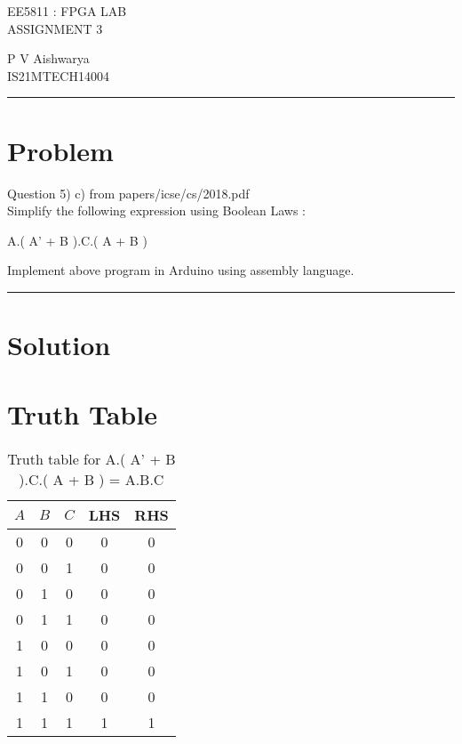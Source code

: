 \documentclass[10pt,a4paper]{article}
\begin{document}
\begin{center}

{\huge EE5811 : FPGA LAB}\\
{\large ASSIGNMENT 3}

\end{center}
P V Aishwarya \\ IS21MTECH14004

\vspace{15pt}
\hrule
\vspace{5pt}


\section*{Problem}

Question 5) c) from papers/icse/cs/2018.pdf\\
Simplify the following expression using Boolean Laws :

\begin{center}
    A.( A' + B ).C.( A + B )
\end{center}

Implement above program in Arduino using assembly language.

\vspace{15pt}
\hrule
\vspace{5pt}

\section*{Solution}

\section*{Truth Table}
\begin{table}[h]
    \centering
    \begin{tabular}{|c|c|c|c|c|}
        \hline
        $A$&$B$&$C$&LHS&RHS \\
        \hline
         0&0&0&0&0 \\
         0&0&1&0&0 \\
         0&1&0&0&0 \\
         0&1&1&0&0 \\
         1&0&0&0&0 \\
         1&0&1&0&0 \\
         1&1&0&0&0 \\
         1&1&1&1&1 \\
         \hline
    \end{tabular}
    \caption{Truth table for A.( A' + B ).C.( A + B ) = A.B.C}
    \label{tab:my_label}
\end{table}
\end{document}
